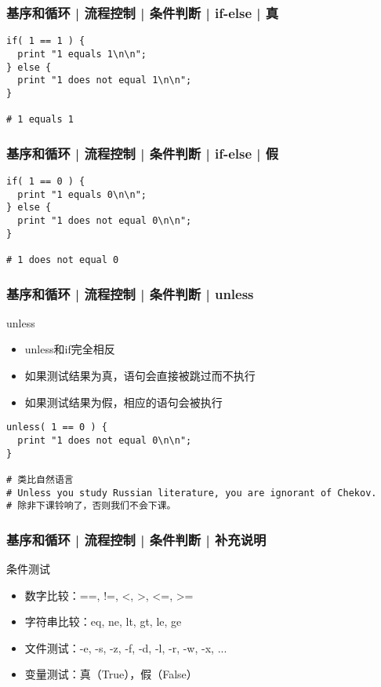 \begin{frame}[fragile]
  \frametitle{基序和循环 | 流程控制 | 条件判断 | \alert{if-else} | 真}
\begin{lstlisting}
if( 1 == 1 ) {
  print "1 equals 1\n\n";
} else {
  print "1 does not equal 1\n\n";
}

# 1 equals 1
\end{lstlisting}
\end{frame}

\begin{frame}[fragile]
  \frametitle{基序和循环 | 流程控制 | 条件判断 | \alert{if-else} | 假}
\begin{lstlisting}
if( 1 == 0 ) {
  print "1 equals 0\n\n";
} else {
  print "1 does not equal 0\n\n";
}

# 1 does not equal 0
\end{lstlisting}
\end{frame}

\begin{frame}[fragile]
  \frametitle{基序和循环 | 流程控制 | 条件判断 | \alert{unless}}
  \begin{block}{unless}
    \begin{itemize}
      \item unless和if完全相反
      \item 如果测试结果为真，语句会直接被跳过而不执行
      \item 如果测试结果为假，相应的语句会被执行
    \end{itemize}
  \end{block}
  \pause
\begin{lstlisting}
unless( 1 == 0 ) {
  print "1 does not equal 0\n\n";
}

# 类比自然语言
# Unless you study Russian literature, you are ignorant of Chekov.
# 除非下课铃响了，否则我们不会下课。
\end{lstlisting}
\end{frame}

\begin{frame}[fragile]
  \frametitle{基序和循环 | 流程控制 | 条件判断 | \alert{补充说明}}
  \begin{block}{条件测试}
    \begin{itemize}
      \item 数字比较：==, !=, <, >, <=, >=
      \item 字符串比较：eq, ne, lt, gt, le, ge
      \item 文件测试：-e, -s, -z, -f, -d, -l, -r, -w, -x, ...
      \item 变量测试：真（True），假（False）
    \end{itemize}
  \end{block}
\end{frame}

